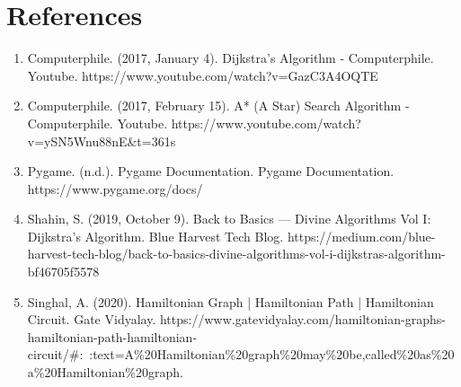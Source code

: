 \documentclass[fontsize=11pt]{article}
\begin{document}
    \section*{References}
    \begin{enumerate}
        \item Computerphile. (2017, January 4). Dijkstra's Algorithm - Computerphile. Youtube. https://www.youtube.com/watch?v=GazC3A4OQTE
        \item Computerphile. (2017, February 15). A* (A Star) Search Algorithm - Computerphile. Youtube. https://www.youtube.com/watch?v=ySN5Wnu88nE\&t=361s
        \item Pygame. (n.d.). Pygame Documentation. Pygame Documentation. https://www.pygame.org/docs/
        \item Shahin, S. (2019, October 9). Back to Basics — Divine Algorithms Vol I: Dijkstra’s Algorithm. Blue Harvest Tech Blog. https://medium.com/blue-harvest-tech-blog/back-to-basics-divine-algorithms-vol-i-dijkstras-algorithm-bf46705f5578
        \item Singhal, A. (2020). Hamiltonian Graph | Hamiltonian Path | Hamiltonian Circuit. Gate Vidyalay. https://www.gatevidyalay.com/hamiltonian-graphs-hamiltonian-path-hamiltonian-circuit/\#:~:text=A\%20Hamiltonian\%20graph\%20may\%20be,called\%20as\%20a\%20Hamiltonian\%20graph.

    \end{enumerate}


\end{document}
